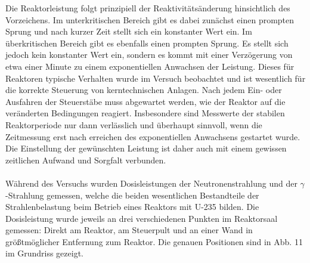 \documentclass[german,  %
parskip=full,  %
]{scrartcl}
\begin{document}
Die Reaktorleistung folgt prinzipiell der Reaktivitätsänderung hinsichtlich des Vorzeichens. Im unterkritischen Bereich gibt es dabei zunächst einen prompten Sprung und nach kurzer Zeit stellt sich ein konstanter Wert ein. Im überkritischen Bereich gibt es ebenfalls einen prompten Sprung. Es stellt sich jedoch kein konstanter Wert ein, sondern es kommt mit einer Verzögerung von etwa einer Minute zu einem exponentiellen Anwachsen der Leistung. Dieses für Reaktoren typische Verhalten wurde im Versuch beobachtet und ist wesentlich für die korrekte Steuerung von kerntechnischen Anlagen. Nach jedem Ein- oder Ausfahren der Steuerstäbe muss abgewartet werden, wie der Reaktor auf die veränderten Bedingungen reagiert. Insbesondere sind Messwerte der stabilen Reaktorperiode nur dann verlässlich und überhaupt sinnvoll, wenn die Zeitmessung erst nach erreichen des exponentiellen Anwachsens gestartet wurde. Die Einstellung der gewünschten Leistung ist daher auch mit einem gewissen zeitlichen Aufwand und Sorgfalt verbunden. \\\\
Während des Versuchs wurden Dosisleistungen der Neutronenstrahlung und der \(\gamma\)-Strahlung gemessen, welche die beiden wesentlichen Bestandteile der Strahlenbelastung beim Betrieb eines Reaktors mit U-235 bilden. Die Dosisleistung wurde jeweils an drei verschiedenen Punkten im Reaktorsaal gemessen: Direkt am Reaktor, am Steuerpult und an einer Wand in größtmöglicher Entfernung zum Reaktor. Die genauen Positionen sind in Abb. 11 im Grundriss gezeigt. 
\newpage
\end{document}
